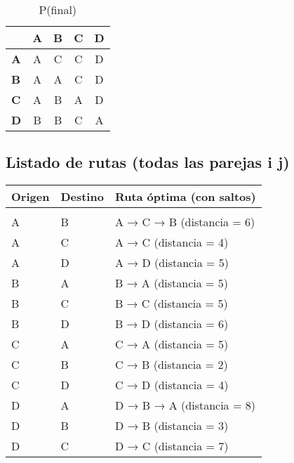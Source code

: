 \documentclass[11pt]{article}
\begin{document}
\begin{table}[H]\centering
\caption{P(final)}
\begin{tabular}{l c c c c}
\toprule
 & \textbf{A} & \textbf{B} & \textbf{C} & \textbf{D}\\\midrule
\textbf{A} & A & C & C & D \\
\textbf{B} & A & A & C & D \\
\textbf{C} & A & B & A & D \\
\textbf{D} & B & B & C & A \\
\bottomrule
\end{tabular}
\end{table}

\subsection*{Listado de rutas (todas las parejas i \neq j)}
\begin{longtable}{llp{}}
\toprule
\textbf{Origen} & \textbf{Destino} & \textbf{Ruta óptima (con saltos)}\\\midrule\\[-1ex]
A & B & A → C → B (distancia = 6)\\
A & C & A → C (distancia = 4)\\
A & D & A → D (distancia = 5)\\
B & A & B → A (distancia = 5)\\
B & C & B → C (distancia = 5)\\
B & D & B → D (distancia = 6)\\
C & A & C → A (distancia = 5)\\
C & B & C → B (distancia = 2)\\
C & D & C → D (distancia = 4)\\
D & A & D → B → A (distancia = 8)\\
D & B & D → B (distancia = 3)\\
D & C & D → C (distancia = 7)\\
\bottomrule
\end{longtable}
\end{document}

